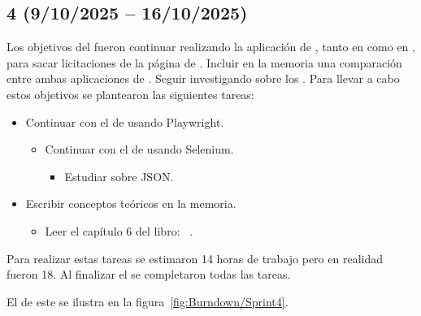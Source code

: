 \subsection{ 4 (9/10/2025 -- 16/10/2025)}
Los objetivos del  fueron continuar realizando la aplicación de , tanto en  como en , para sacar licitaciones de la página de \contsec{}. Incluir en la memoria una comparación entre ambas aplicaciones de . Seguir investigando sobre los .
Para llevar a cabo estos objetivos se plantearon las siguientes tareas:
\begin{itemize}
\tightlist
	\item Continuar con el  de  usando Playwright.
	\begin{itemize}
	\tightlist
		\item Continuar con el  de  usando Selenium.
		\begin{itemize}
		\tightlist
			\item Estudiar sobre JSON.
		\end{itemize}
	\end{itemize}
	\item Escribir conceptos teóricos en la memoria.
	\begin{itemize}
	\tightlist
		\item Leer el capítulo 6 del libro: ~\cite{book:RAG_SimpleGuide}.
	\end{itemize}
\end{itemize}

Para realizar estas tareas se estimaron 14 horas de trabajo pero en realidad fueron 18. Al finalizar el  se completaron todas las tareas.

El  de este  se ilustra en la figura~\ref{fig:Burndown/Sprint4}.

